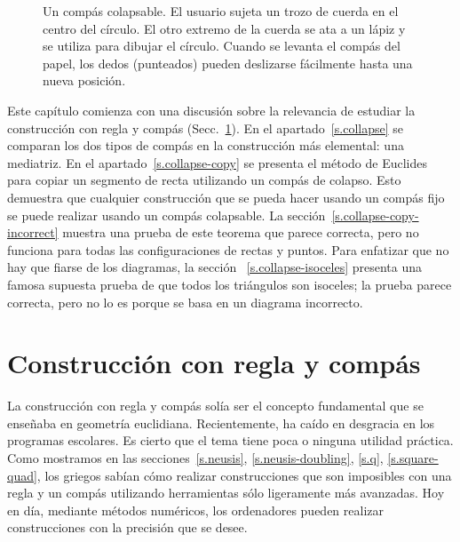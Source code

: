\begin{figure}[htb]
\begin{minipage}{.45\textwidth}
\caption{Un compás colapsable. El usuario sujeta un trozo de cuerda en el centro del círculo. El otro extremo de la cuerda se ata a un lápiz y se utiliza para dibujar el círculo. Cuando se levanta el compás del papel, los dedos (punteados) pueden deslizarse fácilmente hasta una nueva posición.}\label{fig.collapsing-compass}
\end{minipage}
\end{figure}

Este capítulo comienza con una discusión sobre la relevancia de estudiar la construcción con regla y compás (Secc.~\ref{s.relevance}).
En el apartado~\ref{s.collapse} se comparan los dos tipos de compás en la construcción más elemental: una mediatriz. En el apartado~\ref{s.collapse-copy} se presenta el método de Euclides para copiar un segmento de recta utilizando un compás de colapso. Esto demuestra que cualquier construcción que se pueda hacer usando un compás fijo se puede realizar usando un compás colapsable. La sección~\ref{s.collapse-copy-incorrect} muestra una prueba de este teorema que parece correcta, pero no funciona para todas las configuraciones de rectas y puntos. Para enfatizar que no hay que fiarse de los diagramas, la sección ~\ref{s.collapse-isoceles} presenta una famosa supuesta prueba de que todos los triángulos son isoceles; la prueba parece correcta, pero no lo es porque se basa en un diagrama incorrecto.

\section{Construcción con regla y compás}\label{s.relevance}

La construcción con regla y compás solía ser el concepto fundamental que se enseñaba en geometría euclidiana. Recientemente, ha caído en desgracia en los programas escolares. Es cierto que el tema tiene poca o ninguna utilidad práctica. Como mostramos en las secciones~\ref{s.neusis}, \ref{s.neusis-doubling}, \ref{s.q}, \ref{s.square-quad}, los griegos sabían cómo realizar construcciones que son imposibles con una regla y un compás utilizando herramientas sólo ligeramente más avanzadas. Hoy en día, mediante métodos numéricos, los ordenadores pueden realizar construcciones con la precisión que se desee.

